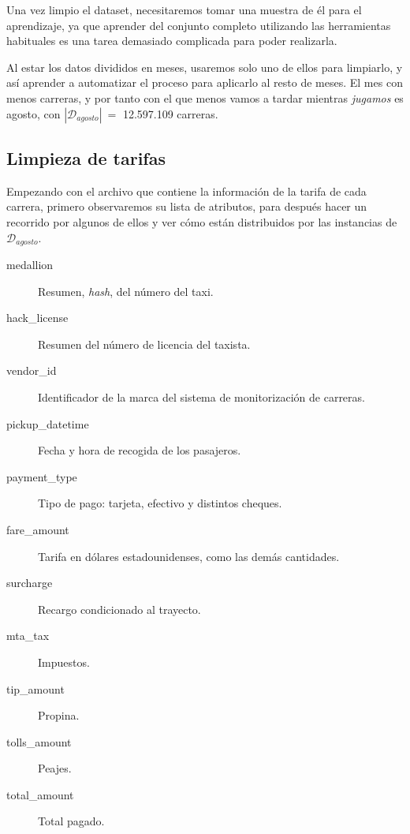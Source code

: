 Una vez limpio el dataset, necesitaremos tomar una muestra de él para el aprendizaje, ya que aprender del conjunto completo utilizando las herramientas habituales es una tarea demasiado complicada para poder realizarla.

Al estar los datos divididos en meses, usaremos solo uno de ellos para limpiarlo, y así aprender a automatizar el proceso para aplicarlo al resto de meses. El mes con menos carreras, y por tanto con el que menos vamos a tardar mientras \emph{jugamos} es agosto, con $|\mathcal{D}_{agosto}|\:=$ 12.597.109 carreras.

\subsection{Limpieza de tarifas} \label{subsec:5.2.1}

Empezando con el archivo que contiene la información de la tarifa de cada carrera, primero observaremos su lista de atributos, para después hacer un recorrido por algunos de ellos y ver cómo están distribuidos por las instancias de $\mathcal{D}_{agosto}$.

\begin{description}
\item[medallion] Resumen, \emph{hash}, del número del taxi.

\item[hack\_license] Resumen del número de licencia del taxista.

\item[vendor\_id] Identificador de la marca del sistema de monitorización de carreras.

\item[pickup\_datetime] Fecha y hora de recogida de los pasajeros.

\item[payment\_type] Tipo de pago: tarjeta, efectivo y distintos cheques.

\item[fare\_amount] Tarifa en dólares estadounidenses, como las demás cantidades.

\item[surcharge] Recargo condicionado al trayecto.

\item[mta\_tax] Impuestos.

\item[tip\_amount] Propina.

\item[tolls\_amount] Peajes.

\item[total\_amount] Total pagado.
\end{description}


